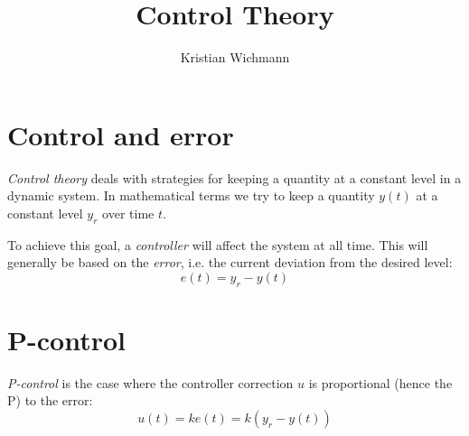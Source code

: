 \documentclass[12pt, a4paper]{article}
\title{Control Theory}
\author{Kristian Wichmann}
\numberwithin{equation}{section}
\begin{document}
\maketitle

\section{Control and error}
\emph{Control theory} deals with strategies for keeping a quantity at a constant level in a dynamic system. In mathematical terms we try to keep a quantity $y(t)$ at a constant level $y_r$ over time $t$.

To achieve this goal, a \emph{controller} will affect the system at all time. This will generally be based on the \emph{error}, i.e. the current deviation from the desired level:
\begin{equation}
e(t)=y_r-y(t)
\end{equation}

\section{P-control}
\emph{P-control} is the case where the controller correction $u$ is proportional (hence the P) to the error:
\begin{equation}
u(t)=ke(t)=k(y_r-y(t))
\end{equation}
\end{document}
